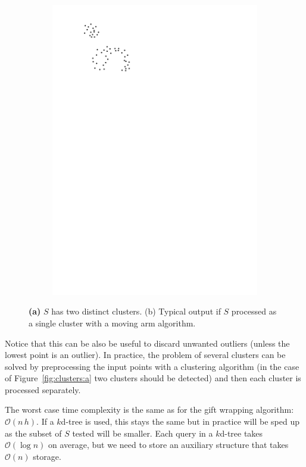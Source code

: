 \begin{figure}
\begin{subfigure}[b]{0.35\linewidth}
    \includegraphics[page=2,width=\textwidth]{figs/clusters.pdf}
    \caption{}
    \label{fig:clusters:b}
  \end{subfigure}
\caption{\textbf{(a)} $S$ has two distinct clusters. {(b)} Typical output if $S$ processed as a single cluster with a moving arm algorithm.}
\label{fig:clusters}
\end{figure}
Notice that this can be also be useful to discard unwanted outliers (unless the lowest point is an outlier).
In practice, the problem of several clusters can be solved by preprocessing the input points with a clustering algorithm (in the case of Figure~\ref{fig:clusters:a} two clusters should be detected) and then each cluster is processed separately.

%

The worst case time complexity is the same as for the gift wrapping algorithm: $\mathcal{O}(n \, h)$.
If a $k$d-tree is used, this stays the same but in practice will be sped up as the subset of $S$ tested will be smaller. 
Each query in a $k$d-tree takes $\mathcal{O}(\log n)$ on average, but we need to store an auxiliary structure that takes $\mathcal{O}(n)$ storage.


